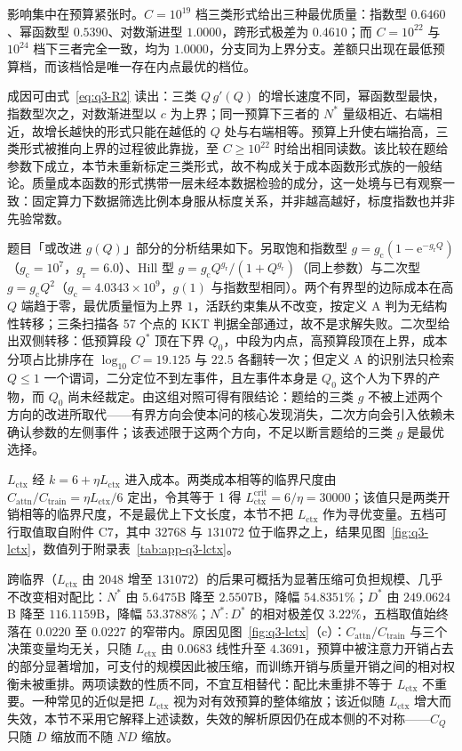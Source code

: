 影响集中在预算紧张时。$C=10^{19}$ 档三类形式给出三种最优质量：指数型 $0.6460$、幂函数型 $0.5390$、对数渐进型 $1.0000$，跨形式极差为 $0.4610$；而 $C=10^{22}$ 与 $10^{24}$ 档下三者完全一致，均为 $1.0000$，分支同为上界分支。差额只出现在最低预算档，而该档恰是唯一存在内点最优的档位。

成因可由式~\eqref{eq:q3-R2} 读出：三类 $Q\,g'(Q)$ 的增长速度不同，幂函数型最快，指数型次之，对数渐进型以 $c$ 为上界；同一预算下三者的 $N^{*}$ 量级相近、右端相近，故增长越快的形式只能在越低的 $Q$ 处与右端相等。预算上升使右端抬高，三类形式被推向上界的过程彼此靠拢，至 $C\ge10^{22}$ 时给出相同读数。该比较在题给参数下成立，本节未重新标定三类形式，故不构成关于成本函数形式族的一般结论。质量成本函数的形式携带一层未经本数据检验的成分，这一处境与已有观察一致：固定算力下数据筛选比例本身服从标度关系，并非越高越好\citep{goyal2024filtering}，标度指数也并非先验常数\citep{bahri2024}。

题目「或改进 $g(Q)$」部分的分析结果如下。另取饱和指数型 $g=g_{\mathrm{c}}(1-\mathrm{e}^{-g_{\mathrm{r}}Q})$（$g_{\mathrm{c}}=10^{7}$，$g_{\mathrm{r}}=6.0$）、Hill 型 $g=g_{\mathrm{c}}Q^{g_{\mathrm{r}}}/(1+Q^{g_{\mathrm{r}}})$（同上参数）与二次型 $g=g_{\mathrm{c}}Q^{2}$（$g_{\mathrm{c}}=4.0343\times10^{9}$，$g(1)$ 与指数型相同）。两个有界型的边际成本在高 $Q$ 端趋于零，最优质量恒为上界 $1$，活跃约束集从不改变，按定义 A 判为无结构性转移；三条扫描各 57 个点的 KKT 判据全部通过，故不是求解失败。二次型给出双侧转移：低预算段 $Q^{*}$ 顶在下界 $Q_0$，中段为内点，高预算段顶在上界，成本分项占比排序在 $\log_{10}C=19.125$ 与 $22.5$ 各翻转一次；但定义 A 的识别法只检索 $Q\le1$ 一个谓词，二分定位不到左事件，且左事件本身是 $Q_0$ 这个人为下界的产物，而 $Q_0$ 尚未经裁定。由这组对照可得有限结论：题给的三类 $g$ 不被上述两个方向的改进所取代——有界方向会使本问的核心发现消失，二次方向会引入依赖未确认参数的左侧事件；该表述限于这两个方向，不足以断言题给的三类 $g$ 是最优选择。

$L_{\text{ctx}}$ 经 $k=6+\eta L_{\text{ctx}}$ 进入成本。两类成本相等的临界尺度由 $C_{\text{attn}}/C_{\text{train}}=\eta L_{\text{ctx}}/6$ 定出，令其等于 1 得 $L_{\text{ctx}}^{\text{crit}}=6/\eta=30000$；该值只是两类开销相等的临界尺度，不是最优上下文长度，本节不把 $L_{\text{ctx}}$ 作为寻优变量。五档可行取值取自附件 C7，其中 $32768$ 与 $131072$ 位于临界之上，结果见图~\ref{fig:q3-lctx}，数值列于附录表~\ref{tab:app-q3-lctx}。

跨临界（$L_{\text{ctx}}$ 由 $2048$ 增至 $131072$）的后果可概括为显著压缩可负担规模、几乎不改变相对配比：$N^{*}$ 由 $5.6475$B 降至 $2.5507$B，降幅 $54.8351\%$；$D^{*}$ 由 $249.0624$B 降至 $116.1159$B，降幅 $53.3788\%$；$N^{*}{:}D^{*}$ 的相对极差仅 $3.22\%$，五档取值始终落在 $0.0220$ 至 $0.0227$ 的窄带内。原因见图~\ref{fig:q3-lctx}（c）：$C_{\text{attn}}/C_{\text{train}}$ 与三个决策变量均无关，只随 $L_{\text{ctx}}$ 由 $0.0683$ 线性升至 $4.3691$，预算中被注意力开销占去的部分显著增加，可支付的规模因此被压缩，而训练开销与质量开销之间的相对权衡未被重排。两项读数的性质不同，不宜互相替代：配比未重排不等于 $L_{\text{ctx}}$ 不重要。一种常见的近似是把 $L_{\text{ctx}}$ 视为对有效预算的整体缩放；该近似随 $L_{\text{ctx}}$ 增大而失效，本节不采用它解释上述读数，失效的解析原因仍在成本侧的不对称——$C_{Q}$ 只随 $D$ 缩放而不随 $ND$ 缩放。

